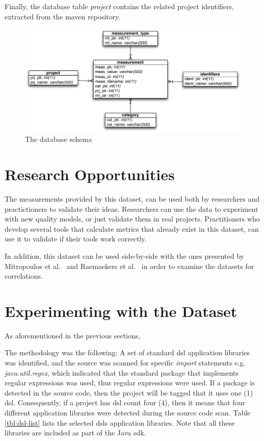 \documentclass{sig-alternate}
\begin{document}
Finally, the database table \textit{project} contains the related project identifiers, extracted from the maven repository.

\begin{figure}
\centering
\includegraphics[scale=0.6]{database-schema}
\caption{The database schema}
\label{fig:database-schema}
\end{figure}

\section{Research Opportunities}
\label{sec:research-opportunities}

The measurements provided by this dataset, can be used both by researchers and practictioners to validate their ideas. Researchers can use the data to experiment with new quality models, or just validate them in real projects. Practitioners who develop several tools that calculate metrics that already exist in this dataset, can use it to validate if their tools work correctly.

In addition, this dataset can be used side-by-side with the ones presented by Mitropoulos et al.~\cite{HP04} and Raemaekers et al.~\cite{RDV13} in order to examine the datasets for correlations.

\section{Experimenting with the Dataset}
\label{sec:dsl}

As aforementioned in the previous sections,


The methodology was the following: A set of standard {\sc dsl} application libraries was identified, and the source was scanned for specific \textit{import} statements e.g. \textit{java.util.regex}, which indicated that the standard package that implements regular expressions was used, thus regular expressions were used. If a package is detected in the source code, then the project will be tagged that it uses one (1) {\sc dsl}. Consequently, if a project has {\sc dsl} count four (4), then it means that four different application libraries were detected during the source code scan. Table \ref{tbl:dsl-list} lists the selected {\sc dsl}s application libraries. Note that all these libraries are included as part of the Java {\sc sdk}.
\end{document}
